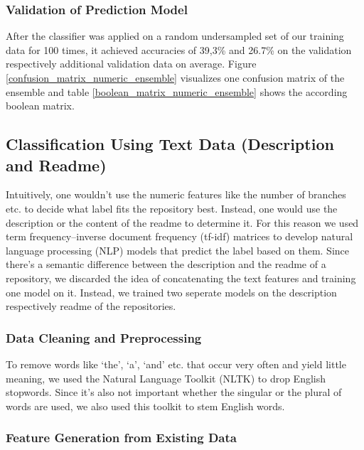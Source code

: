 \documentclass[%
a4paper,
DIV12,
2.5headlines,
bigheadings,
titlepage,
openbib,
]{scrartcl}
\begin{document}
\subsubsection{Validation of Prediction
Model}\label{validation-of-prediction-model}

After the classifier was applied on a random undersampled set of our training data for 100 times, it achieved accuracies of 39,3\% and 26.7\% on the validation respectively additional validation data on average.
Figure \ref{confusion_matrix_numeric_ensemble} visualizes one confusion matrix of the ensemble and table \ref{boolean_matrix_numeric_ensemble} shows the according boolean matrix.


\subsection{Classification Using Text Data (Description and
Readme)}\label{classification-using-text-data-description-and-readme}

Intuitively, one wouldn't use the numeric features like the number of branches etc. to decide what label fits the repository best.
Instead, one would use the description or the content of the readme to determine it.
For this reason we used term frequency--inverse document frequency (tf-idf) matrices to develop natural language processing (NLP) models that predict the label based on them.
Since there's a semantic difference between the description and the readme of a repository, we discarded the idea of concatenating the text features and training one model on it.
Instead, we trained two seperate models on the description respectively readme of the repositories.

\subsubsection{Data Cleaning and
Preprocessing}\label{data-cleaning-and-preprocessing-1}

To remove words like `the', `a', `and' etc. that occur very often and yield little meaning, we used the Natural Language Toolkit (NLTK) to drop English stopwords.
Since it's also not important whether the singular or the plural of words are used, we also used this toolkit to stem English words.

\subsubsection{Feature Generation from Existing
Data}\label{feature-generation-from-existing-data}
\end{document}
